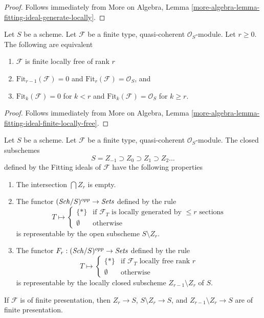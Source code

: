 \begin{proof}
Follows immediately from
More on Algebra, Lemma \ref{more-algebra-lemma-fitting-ideal-generate-locally}.
\end{proof}

\begin{lemma}
\label{lemma-fitting-ideal-finite-locally-free}
Let $S$ be a scheme. Let $\mathcal{F}$ be a finite type, quasi-coherent
$\mathcal{O}_S$-module. Let $r \geq 0$. The following are equivalent
\begin{enumerate}
\item $\mathcal{F}$ is finite locally free of rank $r$
\item $\text{Fit}_{r - 1}(\mathcal{F}) = 0$ and
$\text{Fit}_r(\mathcal{F}) = \mathcal{O}_S$, and
\item $\text{Fit}_k(\mathcal{F}) = 0$ for $k < r$ and
$\text{Fit}_k(\mathcal{F}) = \mathcal{O}_S$ for $k \geq r$.
\end{enumerate}
\end{lemma}

\begin{proof}
Follows immediately from
More on Algebra, Lemma
\ref{more-algebra-lemma-fitting-ideal-finite-locally-free}.
\end{proof}

\begin{lemma}
\label{lemma-locally-free-rank-r-pullback}
Let $S$ be a scheme. Let $\mathcal{F}$ be a finite type, quasi-coherent
$\mathcal{O}_S$-module. The closed subschemes
$$
S = Z_{-1} \supset Z_0 \supset Z_1 \supset Z_2 \ldots
$$
defined by the Fitting ideals of $\mathcal{F}$ have the following
properties
\begin{enumerate}
\item The intersection $\bigcap Z_r$ is empty.
\item The functor $(\mathit{Sch}/S)^{opp} \to \textit{Sets}$ defined by the rule
$$
T \longmapsto
\left\{
\begin{matrix}
\{*\} & \text{if }\mathcal{F}_T\text{ is locally generated by }
\leq r\text{ sections} \\
\emptyset & \text{otherwise}
\end{matrix}
\right.
$$
is representable by the open subscheme $S \setminus Z_r$.
\item The functor $F_r : (\mathit{Sch}/S)^{opp} \to \textit{Sets}$ defined by the rule
$$
T \longmapsto
\left\{
\begin{matrix}
\{*\} & \text{if }\mathcal{F}_T\text{ locally free rank }r\\
\emptyset & \text{otherwise}
\end{matrix}
\right.
$$
is representable by the locally closed subscheme $Z_{r - 1} \setminus Z_r$
of $S$.
\end{enumerate}
If $\mathcal{F}$ is of finite presentation, then
$Z_r \to S$, $S \setminus Z_r \to S$, and $Z_{r - 1} \setminus Z_r \to S$
are of finite presentation.
\end{lemma}

